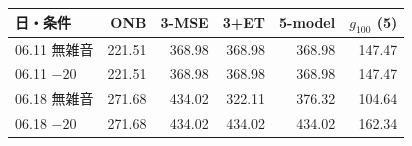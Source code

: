 \begin{tabular}{lrrrrr}
\toprule
日・条件 & ONB & 3-MSE & 3+ET & 5-model & $g_{100}$ (5) \\
\midrule
06.11 無雑音 & 221.51 & 368.98 & 368.98 & 368.98 & 147.47 \\
06.11 $-20$ & 221.51 & 368.98 & 368.98 & 368.98 & 147.47 \\
06.18 無雑音 & 271.68 & 434.02 & 322.11 & 376.32 & 104.64 \\
06.18 $-20$ & 271.68 & 434.02 & 434.02 & 434.02 & 162.34 \\
\bottomrule
\end{tabular}
